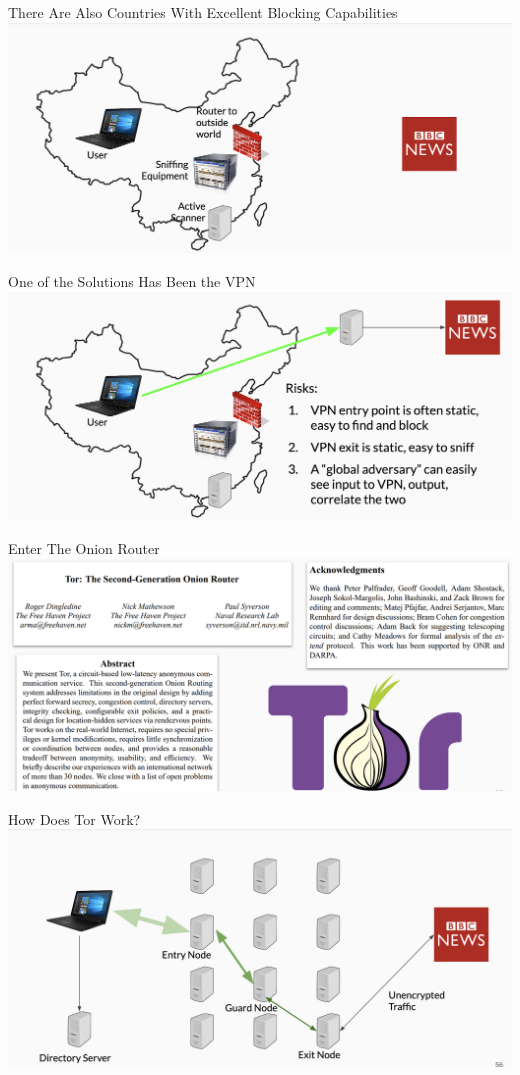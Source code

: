 \documentclass[nobackground,dvipsnames,table]{beamer}
\begin{document}
\begin{frame}{There Are Also Countries With Excellent Blocking Capabilities}
    \includegraphics[width=\textwidth]{china-blocking-diagram}
\end{frame}

\begin{frame}{One of the Solutions Has Been the VPN}
    \includegraphics[width=\textwidth]{vpn-solution}
\end{frame}

\begin{frame}{Enter The Onion Router}
    \includegraphics[width=\textwidth]{tor}
\end{frame}

\begin{frame}{How Does Tor Work?}
    \includegraphics[width=\textwidth]{how-tor-works}
\end{frame}
\end{document}
